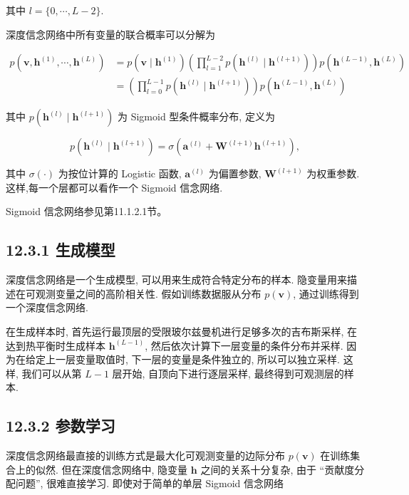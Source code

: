 \documentclass[10pt]{article}
\begin{document}
其中 $l=\{0, \cdots, L-2\}$.

深度信念网络中所有变量的联合概率可以分解为


\begin{align*}
p\left(\boldsymbol{v}, \boldsymbol{h}^{(1)}, \cdots, \boldsymbol{h}^{(L)}\right) & =p\left(\boldsymbol{v} \mid \boldsymbol{h}^{(1)}\right)\left(\prod_{l=1}^{L-2} p\left(\boldsymbol{h}^{(l)} \mid \boldsymbol{h}^{(l+1)}\right)\right) p\left(\boldsymbol{h}^{(L-1)}, \boldsymbol{h}^{(L)}\right)  \tag{12.60}\\
& =\left(\prod_{l=0}^{L-1} p\left(\boldsymbol{h}^{(l)} \mid \boldsymbol{h}^{(l+1)}\right)\right) p\left(\boldsymbol{h}^{(L-1)}, \boldsymbol{h}^{(L)}\right) \tag{12.61}
\end{align*}


其中 $p\left(\boldsymbol{h}^{(l)} \mid \boldsymbol{h}^{(l+1)}\right)$ 为 Sigmoid 型条件概率分布, 定义为


\begin{equation*}
p\left(\boldsymbol{h}^{(l)} \mid \boldsymbol{h}^{(l+1)}\right)=\sigma\left(\boldsymbol{a}^{(l)}+\boldsymbol{W}^{(l+1)} \boldsymbol{h}^{(l+1)}\right), \tag{12.62}
\end{equation*}


其中 $\sigma(\cdot)$ 为按位计算的 Logistic 函数, $\boldsymbol{a}^{(l)}$ 为偏置参数, $\boldsymbol{W}^{(l+1)}$ 为权重参数. 这样,每一个层都可以看作一个 Sigmoid 信念网络.

Sigmoid 信念网络参见第11.1.2.1节。

\subsection*{12.3.1 生成模型}
深度信念网络是一个生成模型, 可以用来生成符合特定分布的样本. 隐变量用来描述在可观测变量之间的高阶相关性. 假如训练数据服从分布 $p(\boldsymbol{v})$, 通过训练得到一个深度信念网络.

在生成样本时, 首先运行最顶层的受限玻尔兹曼机进行足够多次的吉布斯采样, 在达到热平衡时生成样本 $\boldsymbol{h}^{(L-1)}$, 然后依次计算下一层变量的条件分布并采样. 因为在给定上一层变量取值时, 下一层的变量是条件独立的, 所以可以独立采样. 这样, 我们可以从第 $L-1$ 层开始, 自顶向下进行逐层采样, 最终得到可观测层的样本.

\subsection*{12.3.2 参数学习}
深度信念网络最直接的训练方式是最大化可观测变量的边际分布 $p(\boldsymbol{v})$ 在训练集合上的似然. 但在深度信念网络中, 隐变量 $\boldsymbol{h}$ 之间的关系十分复杂, 由于 “贡献度分配问题”, 很难直接学习. 即使对于简单的单层 Sigmoid 信念网络
\end{document}
